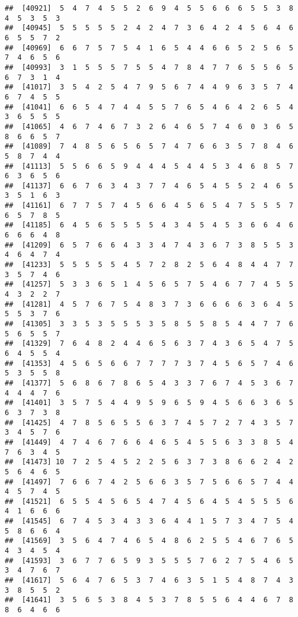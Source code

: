 \documentclass[
]{book}
\begin{document}
\begin{verbatim}
##  [40921]  5  4  7  4  5  5  2  6  9  4  5  5  6  6  6  5  5  3  8  4  5  3  5  3
##  [40945]  5  5  5  5  5  2  4  2  4  7  3  6  4  2  4  5  6  4  6  6  5  5  7  2
##  [40969]  6  6  7  5  7  5  4  1  6  5  4  4  6  6  5  2  5  6  5  7  4  6  5  6
##  [40993]  3  1  5  5  5  7  5  5  4  7  8  4  7  7  6  5  5  6  5  6  7  3  1  4
##  [41017]  3  5  4  2  5  4  7  9  5  6  7  4  4  9  6  3  5  7  4  6  7  4  5  5
##  [41041]  6  6  5  4  7  4  4  5  5  7  6  5  4  6  4  2  6  5  4  3  6  5  5  5
##  [41065]  4  6  7  4  6  7  3  2  6  4  6  5  7  4  6  0  3  6  5  8  6  6  5  7
##  [41089]  7  4  8  5  6  5  6  5  7  4  7  6  6  3  5  7  8  4  6  5  8  7  4  4
##  [41113]  5  5  6  6  5  9  4  4  4  5  4  4  5  3  4  6  8  5  7  6  3  6  5  6
##  [41137]  6  6  7  6  3  4  3  7  7  4  6  5  4  5  5  2  4  6  5  3  5  1  6  3
##  [41161]  6  7  7  5  7  4  5  6  6  4  5  6  5  4  7  5  5  5  7  6  5  7  8  5
##  [41185]  6  4  5  6  5  5  5  5  4  3  4  5  4  5  3  6  6  4  6  6  6  6  4  8
##  [41209]  6  5  7  6  6  4  3  3  4  7  4  3  6  7  3  8  5  5  3  4  6  4  7  4
##  [41233]  5  5  5  5  5  4  5  7  2  8  2  5  6  4  8  4  4  7  7  3  5  7  4  6
##  [41257]  5  3  3  6  5  1  4  5  6  5  7  5  4  6  7  7  4  5  5  4  3  2  2  7
##  [41281]  4  5  7  6  7  5  4  8  3  7  3  6  6  6  6  3  6  4  5  5  5  3  7  6
##  [41305]  3  3  5  3  5  5  5  3  5  8  5  5  8  5  4  4  7  7  6  5  6  5  5  7
##  [41329]  7  6  4  8  2  4  4  6  5  6  3  7  4  3  6  5  4  7  5  6  4  5  5  4
##  [41353]  4  5  6  5  6  6  7  7  7  7  3  7  4  5  6  5  7  4  6  5  3  5  5  8
##  [41377]  5  6  8  6  7  8  6  5  4  3  3  7  6  7  4  5  3  6  7  4  4  4  7  6
##  [41401]  3  5  7  5  4  4  9  5  9  6  5  9  4  5  6  6  3  6  5  6  3  7  3  8
##  [41425]  4  7  8  5  6  5  5  6  3  7  4  5  7  2  7  4  3  5  7  3  4  5  7  6
##  [41449]  4  7  4  6  7  6  6  4  6  5  4  5  5  6  3  3  8  5  4  7  6  3  4  5
##  [41473] 10  7  2  5  4  5  2  2  5  6  3  7  3  8  6  6  2  4  2  5  6  4  6  5
##  [41497]  7  6  6  7  4  2  5  6  6  3  5  7  5  6  6  5  7  4  4  4  5  7  4  5
##  [41521]  6  5  5  4  5  6  5  4  7  4  5  6  4  5  4  5  5  5  6  4  1  6  6  6
##  [41545]  6  7  4  5  3  4  3  3  6  4  4  1  5  7  3  4  7  5  4  5  8  6  6  4
##  [41569]  3  5  6  4  7  4  6  5  4  8  6  2  5  5  4  6  7  6  5  4  3  4  5  4
##  [41593]  3  6  7  7  6  5  9  3  5  5  5  7  6  2  7  5  4  6  5  3  4  7  6  7
##  [41617]  5  6  4  7  6  5  3  7  4  6  3  5  1  5  4  8  7  4  3  3  8  5  5  2
##  [41641]  3  5  6  5  3  8  4  5  3  7  8  5  5  6  4  4  6  7  8  8  6  4  6  6

\end{verbatim}
\end{document}
